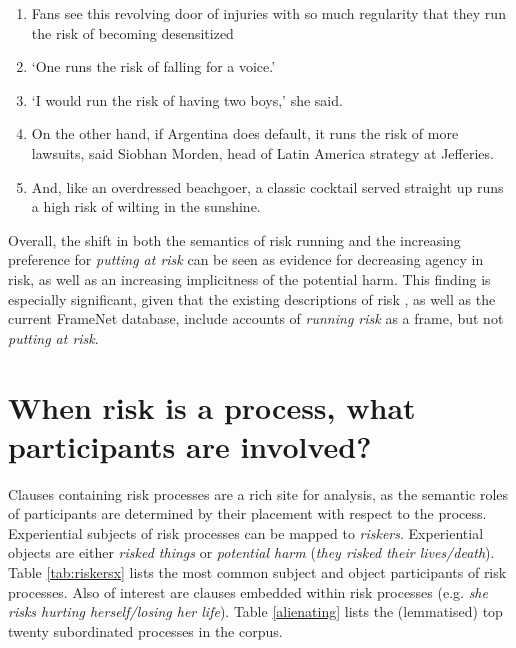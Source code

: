             \begin{enumerate} [before=\itshape,font=\normalfont]   \setlength\itemsep{0em} \small
            \item Fans see this revolving door of injuries with so much regularity that they run the risk of becoming desensitized 
            \item `One runs the risk of falling for a voice.'
            \item `I would run the risk of having two boys,' she said.
            \item On the other hand, if Argentina does default, it runs the risk of more lawsuits, said Siobhan Morden, head of Latin America strategy at Jefferies.
            \item And, like an overdressed beachgoer, a classic cocktail served straight up runs a high risk of wilting in the sunshine.
            \end{enumerate}
            Overall, the shift in both the semantics of risk running and the increasing preference for \emph{putting at risk} can be seen as evidence for decreasing agency in risk, as well as an increasing implicitness of the potential harm. This finding is especially significant, given that the existing descriptions of risk \cite{fillmore_toward_1992}, as well as the current FrameNet database, include accounts of \emph{running risk} as a frame, but not \emph{putting at risk}.
		
		\section{When risk is a process, what participants are involved?}
		\FloatBarrier
		
		Clauses containing risk processes are a rich site for analysis, as the semantic roles of participants are determined by their placement with respect to the process. Experiential subjects of risk processes can be mapped to \emph{riskers}. Experiential objects are either \emph{risked things} or \emph{potential harm} (\emph{they risked their lives/death}). Table \ref{tab:riskersx} lists the most common subject and object participants of risk processes. Also of interest are clauses embedded within risk processes (e.g. \emph{she risks hurting herself/losing her life}). Table \ref{alienating} lists the (lemmatised) top twenty subordinated processes in the corpus.

